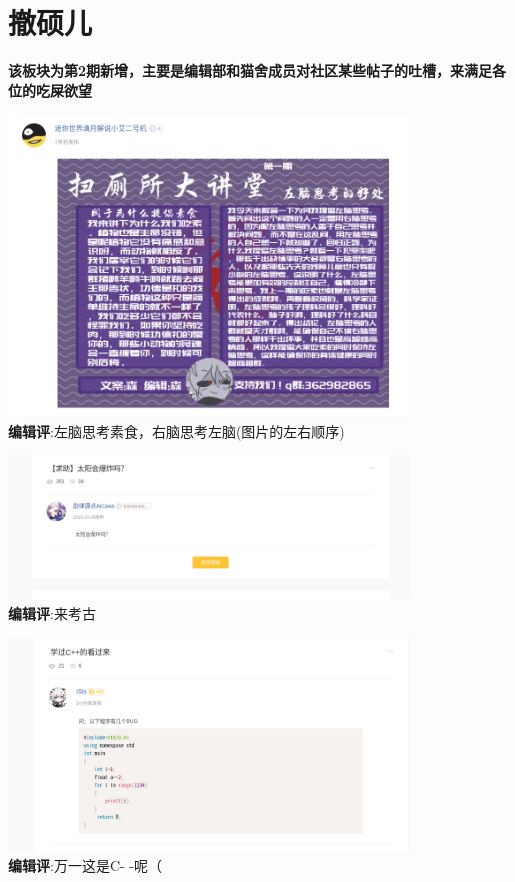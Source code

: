 \documentclass[UTF8]{ctexart}
\begin{document}
\part{撤硕儿}
\begin{center}
\textbf{该板块为第2期新增，主要是编辑部和猫舍成员对社区某些帖子的吐槽，来满足各位的吃屎欲望}
\end{center}
\includegraphics[width=0.8\textwidth]{assets/02/toliet-1.png} \\
\textbf{编辑评}:左脑思考素食，右脑思考左脑(图片的左右顺序)

\includegraphics[width=0.8\textwidth]{assets/02/toliet-2.png} \\
\textbf{编辑评}:来考古

\includegraphics[width=0.8\textwidth]{assets/02/toliet-3.png} \\
\textbf{编辑评}:万一这是C- -呢（
\end{document}
